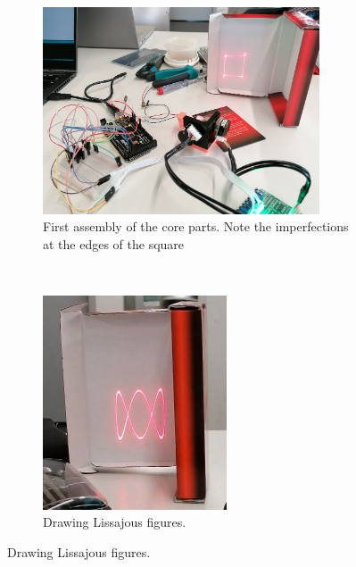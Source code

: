 \documentclass{report}
\begin{document}
\begin{figure}[h]
	\centering
	\begin{subfigure}[b]{0.45\textwidth}
		\centering
		\includegraphics[width=0.9\textwidth]{assembly.jpg}
		\caption{First assembly of the core parts. Note the imperfections at the edges of the square}
		\label{img:assembly}
	\end{subfigure}
	~
	\begin{subfigure}[b]{0.45\textwidth}
		\centering
		\includegraphics[width=0.6\textwidth]{lissajous.jpg}
		\caption{Drawing Lissajous figures.}
		\label{img:lissajous}
	\end{subfigure}


\end{figure}
\end{document}

